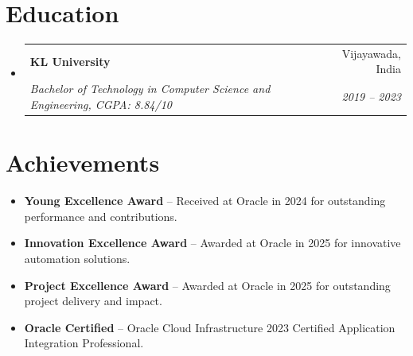 \documentclass[letterpaper,11pt]{article}
\makeatletter
\newcommand{\resumeItem}[1]{
  \item\small{
    {#1 \vspace{-2pt}}
  }
}
\newcommand{\resumeSubheading}[4]{
  \vspace{-2pt}\item
    \begin{tabular*}{0.97\textwidth}[t]{l@{\extracolsep{\fill}}r}
      \textbf{#1} & #2 \\
      \textit{\small#3} & \textit{\small #4} \\
    \end{tabular*}\vspace{-7pt}
}
\newcommand{\resumeSubHeadingListStart}{\begin{itemize}[leftmargin=0.15in, label={}]}
\newcommand{\resumeSubHeadingListEnd}{\end{itemize}}
\newcommand{\resumeItemListStart}{\begin{itemize}}
\newcommand{\resumeItemListEnd}{\end{itemize}\vspace{-5pt}}
\makeatother
\begin{document}
\section{Education}
\resumeSubHeadingListStart
    \resumeSubheading
        {KL University}{Vijayawada, India}
        {Bachelor of Technology in Computer Science and Engineering, CGPA: 8.84/10}{2019 -- 2023}
\resumeSubHeadingListEnd

\section{Achievements}
\resumeItemListStart
    \resumeItem{\textbf{Young Excellence Award} -- Received at Oracle in 2024 for outstanding performance and contributions.}
    \resumeItem{\textbf{Innovation Excellence Award} -- Awarded at Oracle in 2025 for innovative automation solutions.}
    \resumeItem{\textbf{Project Excellence Award} -- Awarded at Oracle in 2025 for outstanding project delivery and impact.}
    \resumeItem{\textbf{Oracle Certified} -- Oracle Cloud Infrastructure 2023 Certified Application Integration Professional.}
\resumeItemListEnd
\end{document}
